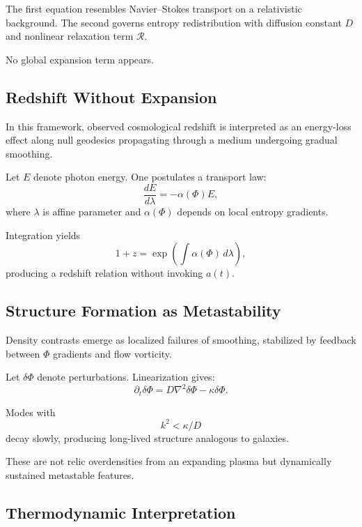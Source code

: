 \documentclass[12pt]{article}
\begin{document}
The first equation resembles Navier--Stokes transport on a relativistic background. The second governs entropy redistribution with diffusion constant $D$ and nonlinear relaxation term $\mathcal{R}$.

No global expansion term appears.

\subsection{Redshift Without Expansion}

In this framework, observed cosmological redshift is interpreted as an energy-loss effect along null geodesics propagating through a medium undergoing gradual smoothing.

Let $E$ denote photon energy. One postulates a transport law:
\begin{equation}
\frac{dE}{d\lambda} = -\alpha(\Phi) E,
\end{equation}
where $\lambda$ is affine parameter and $\alpha(\Phi)$ depends on local entropy gradients.

Integration yields
\begin{equation}
1+z = \exp\left(\int \alpha(\Phi)\, d\lambda\right),
\end{equation}
producing a redshift relation without invoking $a(t)$.

\subsection{Structure Formation as Metastability}

Density contrasts emerge as localized failures of smoothing, stabilized by feedback between $\Phi$ gradients and flow vorticity.

Let $\delta\Phi$ denote perturbations. Linearization gives:
\begin{equation}
\partial_t \delta\Phi = D\nabla^2 \delta\Phi - \kappa \delta\Phi.
\end{equation}

Modes with
\[
k^2 < \kappa/D
\]
decay slowly, producing long-lived structure analogous to galaxies.

These are not relic overdensities from an expanding plasma but dynamically sustained metastable features.

\subsection{Thermodynamic Interpretation}
\end{document}
